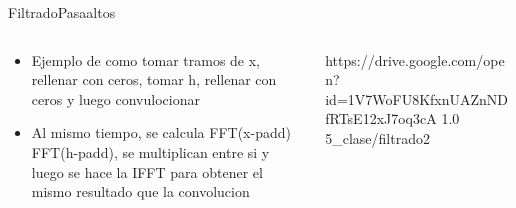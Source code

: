 \begin{frame}[t]{Filtrado}{Pasaaltos}
   \begin{columns}[t]
      \begin{column}{.4\textwidth}
         \begin{itemize}
            \item{Ejemplo de como tomar tramos de x, rellenar con ceros, tomar h, rellenar con ceros y luego convulocionar}
            \item{Al mismo tiempo, se calcula FFT(x-padd) FFT(h-padd), se multiplican entre si y luego se hace la IFFT para obtener el mismo resultado que la convolucion}
         \end{itemize}
      \end{column}
      \hspace{2pt}
      \vrule
      \hspace{2pt}
      \begin{column}{.6\textwidth}
         {https://drive.google.com/open?id=1V7WoFU8KfxnUAZnNDfRTsE12xJ7oq3cA}
         {1.0}
         {5_clase/filtrado2}
      \end{column}
      \hspace{2pt}
   \end{columns}
   \vfill
\end{frame}
